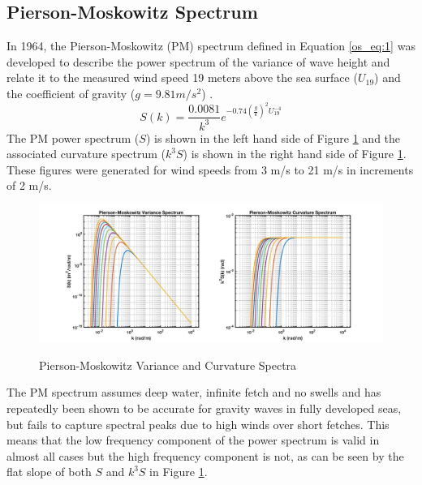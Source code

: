 \subsection{Pierson-Moskowitz Spectrum}
In 1964, the Pierson-Moskowitz (PM) spectrum defined in Equation \ref{os_eq:1} was developed to describe the power spectrum of the variance of wave height and relate it to the measured wind speed 19 meters above the sea surface ($U_{19}$) and the coefficient of gravity ($g=9.81 m/s^2$) \cite{michel_sea_spectra}. 
 \begin{equation}
S(k) = \frac{0.0081}{k^3}e^{-0.74\left(\frac{g}{k}\right)^2U_{19}^{-4}}
\label{os_eq:1}
\end{equation}
 \renewcommand{\baselinestretch}{2} \small\normalsize
 The PM power spectrum ($S$) is shown in the left hand side of Figure \ref{os_fig:1} and the associated curvature spectrum ($k^3S$) is shown in the right hand side of Figure \ref{os_fig:1}. These figures were generated for wind speeds from 3 m/s to 21 m/s in increments of 2 m/s.
 
 \begin{figure}[H]
  \begin{center}
\includegraphics[width=6in]{../media/Ocean_Surface/PM_variance_curvature_spectrum.png}
  \end{center}
  \renewcommand{\baselinestretch}{1} \small\normalsize
  \begin{quote}
    \caption[Pierson-Moskowitz Variance and Curvature Spectra]{Pierson-Moskowitz Variance and Curvature Spectra\label{os_fig:1}}
  \end{quote}
\end{figure}
 \renewcommand{\baselinestretch}{2} \small\normalsize
 
The PM spectrum assumes deep water, infinite fetch and no swells and has repeatedly been shown to be accurate for gravity waves in fully developed seas, but fails to capture spectral peaks due to high winds over short fetches. This means that the low frequency component of the power spectrum is valid in almost all cases but the high frequency component is not, as can be seen by the flat slope of both $S$ and $k^3S$ in Figure \ref{os_fig:1}.

